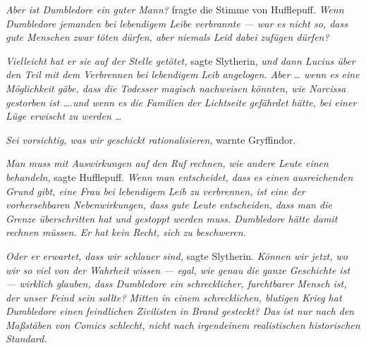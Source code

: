 \emph{Aber \emph{ist} Dumbledore ein guter Mann?} fragte die Stimme von Hufflepuff. \emph{Wenn Dumbledore jemanden bei lebendigem Leibe verbrannte — war es nicht so, dass gute Menschen zwar töten dürfen, aber niemals Leid dabei zufügen dürfen?}

\emph{Vielleicht hat er sie auf der Stelle getötet,} sagte Slytherin, \emph{und dann Lucius über den Teil mit dem Verbrennen bei lebendigem Leib angelogen. Aber … wenn es eine Möglichkeit gäbe, dass die Todesser magisch nachweisen könnten, wie Narcissa gestorben ist ….und wenn es die Familien der Lichtseite gefährdet hätte, bei einer Lüge erwischt zu werden …}

\emph{Sei vorsichtig, was wir geschickt rationalisieren}, warnte Gryffindor.

\emph{Man muss mit Auswirkungen auf den Ruf rechnen, wie andere Leute einen behandeln,} sagte Hufflepuff. \emph{Wenn man entscheidet, dass es einen ausreichenden Grund gibt, eine Frau bei lebendigem Leib zu verbrennen, ist eine der vorhersehbaren Nebenwirkungen, dass gute Leute entscheiden, dass man die Grenze überschritten hat und gestoppt werden muss. Dumbledore hätte damit rechnen müssen. Er hat kein Recht, sich zu beschweren.}

\emph{Oder er erwartet, dass wir schlauer sind,} sagte Slytherin. \emph{Können wir jetzt, wo wir so viel von der Wahrheit wissen — egal, wie genau die ganze Geschichte ist — wirklich glauben, dass Dumbledore ein schrecklicher, furchtbarer Mensch ist, der unser Feind sein sollte? Mitten in einem schrecklichen, blutigen Krieg hat Dumbledore einen} \emph{feindlichen Zivilisten in Brand gesteckt? Das ist nur nach den Maßstäben von Comics schlecht, nicht nach irgendeinem realistischen historischen Standard.}

